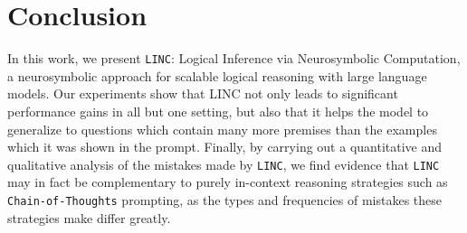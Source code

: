 \documentclass[11pt]{article}
\newcommand{\bl}[1]{\textcolor{green}{}}
\newcommand{\bl}[1]{\textcolor{green}{\bf\small [BL: #1]}}
\begin{document}

\section{Conclusion}

In this work, we present \texttt{LINC}: Logical Inference via Neurosymbolic Computation, a neurosymbolic approach for scalable logical reasoning with large language models. 
Our experiments show that LINC not only leads to significant performance gains in all but one setting, but also that it helps the model to generalize to questions which contain many more premises than the examples which it was shown in the prompt.
Finally, by carrying out a quantitative and qualitative analysis of the mistakes made by \texttt{LINC}, we find evidence that \texttt{LINC} may in fact be complementary to purely in-context reasoning strategies such as \texttt{Chain-of-Thoughts} prompting, as the types and frequencies of mistakes these strategies make differ greatly.


\end{document}
